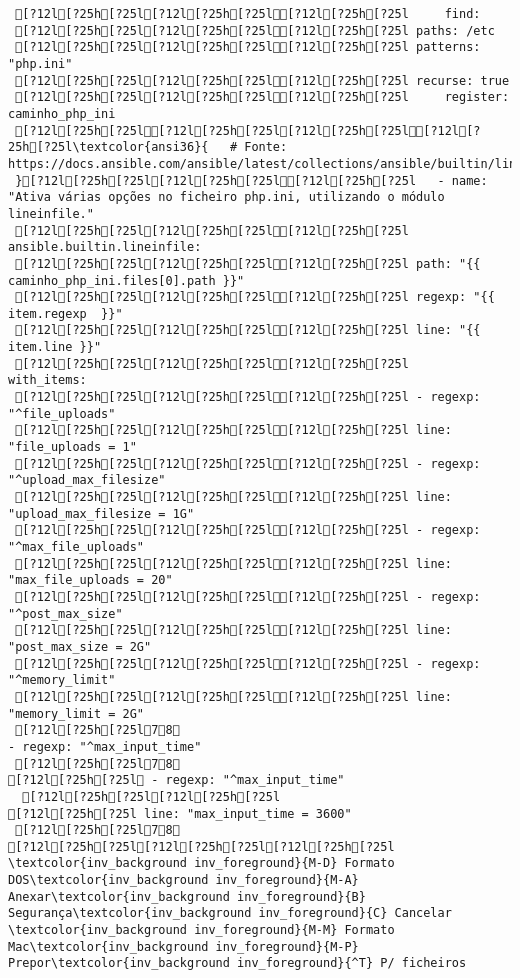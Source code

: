 \documentclass{scrartcl}
\begin{document}
\begin{Verbatim}
 [?12l[?25h[?25l[?12l[?25h[?25l[?12l[?25h[?25l     find:
 [?12l[?25h[?25l[?12l[?25h[?25l[?12l[?25h[?25l paths: /etc
 [?12l[?25h[?25l[?12l[?25h[?25l[?12l[?25h[?25l patterns: "php.ini"
 [?12l[?25h[?25l[?12l[?25h[?25l[?12l[?25h[?25l recurse: true
 [?12l[?25h[?25l[?12l[?25h[?25l[?12l[?25h[?25l     register: caminho_php_ini
 [?12l[?25h[?25l[?12l[?25h[?25l[?12l[?25h[?25l[?12l[?25h[?25l\textcolor{ansi36}{   # Fonte: https://docs.ansible.com/ansible/latest/collections/ansible/builtin/lineinfile_module.html
 }[?12l[?25h[?25l[?12l[?25h[?25l[?12l[?25h[?25l   - name: "Ativa várias opções no ficheiro php.ini, utilizando o módulo lineinfile."
 [?12l[?25h[?25l[?12l[?25h[?25l[?12l[?25h[?25l     ansible.builtin.lineinfile:
 [?12l[?25h[?25l[?12l[?25h[?25l[?12l[?25h[?25l path: "{{ caminho_php_ini.files[0].path }}"
 [?12l[?25h[?25l[?12l[?25h[?25l[?12l[?25h[?25l regexp: "{{ item.regexp  }}"
 [?12l[?25h[?25l[?12l[?25h[?25l[?12l[?25h[?25l line: "{{ item.line }}"
 [?12l[?25h[?25l[?12l[?25h[?25l[?12l[?25h[?25l     with_items:
 [?12l[?25h[?25l[?12l[?25h[?25l[?12l[?25h[?25l - regexp: "^file_uploads"
 [?12l[?25h[?25l[?12l[?25h[?25l[?12l[?25h[?25l line: "file_uploads = 1"
 [?12l[?25h[?25l[?12l[?25h[?25l[?12l[?25h[?25l - regexp: "^upload_max_filesize"
 [?12l[?25h[?25l[?12l[?25h[?25l[?12l[?25h[?25l line: "upload_max_filesize = 1G"
 [?12l[?25h[?25l[?12l[?25h[?25l[?12l[?25h[?25l - regexp: "^max_file_uploads"
 [?12l[?25h[?25l[?12l[?25h[?25l[?12l[?25h[?25l line: "max_file_uploads = 20"
 [?12l[?25h[?25l[?12l[?25h[?25l[?12l[?25h[?25l - regexp: "^post_max_size"
 [?12l[?25h[?25l[?12l[?25h[?25l[?12l[?25h[?25l line: "post_max_size = 2G"
 [?12l[?25h[?25l[?12l[?25h[?25l[?12l[?25h[?25l - regexp: "^memory_limit"
 [?12l[?25h[?25l[?12l[?25h[?25l[?12l[?25h[?25l line: "memory_limit = 2G"
 [?12l[?25h[?25l78
- regexp: "^max_input_time"
 [?12l[?25h[?25l78
[?12l[?25h[?25l - regexp: "^max_input_time"
  [?12l[?25h[?25l[?12l[?25h[?25l
[?12l[?25h[?25l line: "max_input_time = 3600"
 [?12l[?25h[?25l78
[?12l[?25h[?25l[?12l[?25h[?25l[?12l[?25h[?25l         \textcolor{inv_background inv_foreground}{M-D} Formato DOS\textcolor{inv_background inv_foreground}{M-A} Anexar\textcolor{inv_background inv_foreground}{B} Segurança\textcolor{inv_background inv_foreground}{C} Cancelar           \textcolor{inv_background inv_foreground}{M-M} Formato Mac\textcolor{inv_background inv_foreground}{M-P} Prepor\textcolor{inv_background inv_foreground}{^T} P/ ficheiros

\end{Verbatim}
\end{document}
